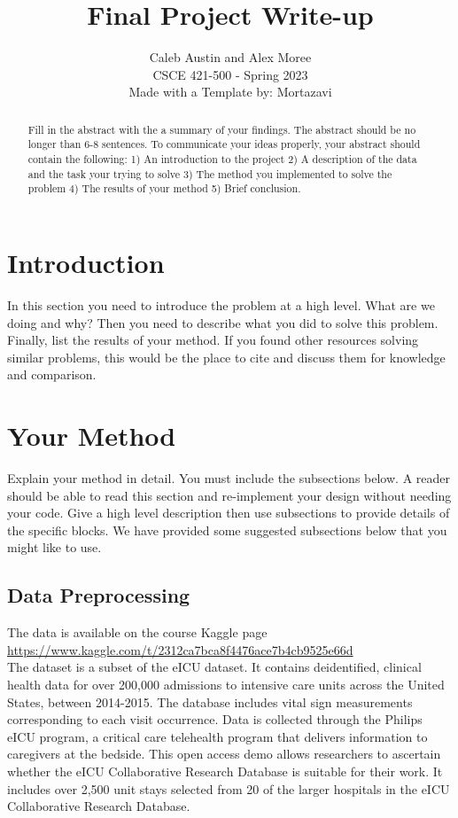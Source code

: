 \documentclass{article}
\title{Final Project Write-up}
\author{%
  Caleb Austin and Alex Moree\\
  CSCE 421-500 - Spring 2023\\
  Made with a Template by: Mortazavi
}
\begin{document}
\maketitle


\begin{abstract}
  Fill in the abstract with the a summary of your findings. The abstract should be no longer than 6-8 sentences. To communicate your ideas properly, your abstract should contain the following: 1) An introduction to the project 2) A description of the data and the task your trying to solve 3) The method you implemented to solve the problem 4) The results of your method 5) Brief conclusion.
\end{abstract}


\section{Introduction}

In this section you need to introduce the problem at a high level. What are we doing and why? Then you need to describe what you did to solve this problem. Finally, list the results of your method. If you found other resources solving similar problems, this would be the place to cite and discuss them for knowledge and comparison.

\section{Your Method}

Explain your method in detail. You must include the subsections below. A reader should be able to read this section and re-implement your design without needing your code. Give a high level description then use subsections to provide details of the specific blocks. We have provided some suggested subsections below that you might like to use.

\subsection{Data Preprocessing}

The data is available on the course Kaggle page \\\href{https://www.kaggle.com/t/2312ca7bca8f4476ace7b4cb9525e66d}{https://www.kaggle.com/t/2312ca7bca8f4476ace7b4cb9525e66d} \\
The dataset is a subset of the eICU dataset. It contains deidentified, clinical health data for over 200,000 admissions to intensive care units across the United States, between 2014-2015. The database includes vital sign measurements corresponding to each visit occurrence. Data is collected through the Philips eICU program, a critical care telehealth program that delivers information to caregivers at the bedside. This open access demo allows researchers to ascertain whether the eICU Collaborative Research Database is suitable for their work. It includes over 2,500 unit stays selected from 20 of the larger hospitals in the eICU Collaborative Research Database.
\end{document}
